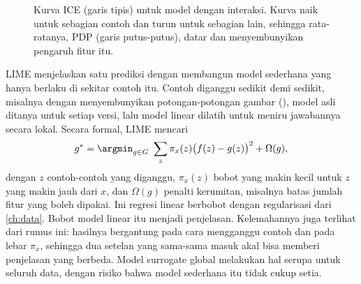 \begin{figure}[ht]
\centering
{}
\caption{Kurva ICE (garis tipis) untuk model dengan interaksi. Kurva naik untuk sebagian contoh dan turun untuk
sebagian lain, sehingga rata-ratanya, PDP (garis putus-putus), datar dan menyembunyikan pengaruh fitur itu.}
\label{fig:ice}
\end{figure}

LIME \citep{ribeiro2016} menjelaskan satu prediksi dengan membangun model sederhana yang hanya berlaku
di sekitar contoh itu. Contoh diganggu sedikit demi sedikit, misalnya dengan menyembunyikan
potongan-potongan gambar (), model asli ditanya untuk setiap versi, lalu model
linear dilatih untuk meniru jawabannya secara lokal. Secara formal, LIME mencari
\begin{equation}
g^*=\argmin_{g\in G}\ \sum_{z}\pi_x(z)\big(f(z)-g(z)\big)^2+\Omega(g),
\end{equation}
dengan $z$ contoh-contoh yang diganggu, $\pi_x(z)$ bobot yang makin kecil untuk $z$ yang makin jauh dari $x$, dan
$\Omega(g)$ penalti kerumitan, misalnya batas jumlah fitur yang boleh dipakai. Ini regresi linear berbobot dengan
regularisasi dari \cref{ch:data}. Bobot model linear itu menjadi penjelasan. Kelemahannya juga terlihat dari rumus
ini: hasilnya bergantung pada cara mengganggu contoh dan pada lebar $\pi_x$, sehingga dua setelan yang sama-sama masuk
akal bisa memberi penjelasan yang berbeda. Model
surrogate global melakukan hal serupa untuk seluruh data, dengan risiko bahwa model sederhana itu
tidak cukup setia.

